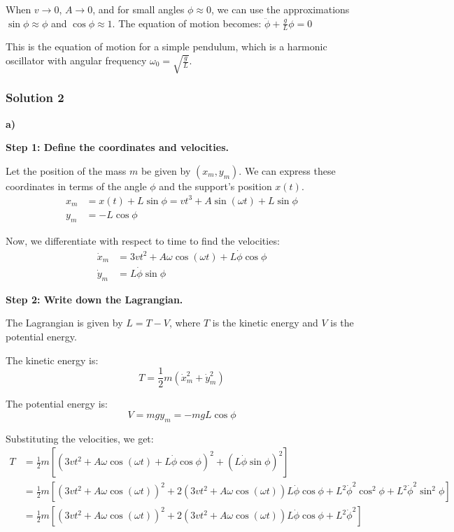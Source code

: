 \documentclass{article}
\begin{document}
When $v \to 0$, $A \to 0$, and for small angles $\phi \approx 0$, we can use the approximations $\sin\phi \approx \phi$ and $\cos\phi \approx 1$.
The equation of motion becomes:
$\ddot{\phi} + \frac{g}{L}\phi = 0$

This is the equation of motion for a simple pendulum, which is a harmonic oscillator with angular frequency $\omega_0 = \sqrt{\frac{g}{L}}$.


\subsubsection{Solution 2}
\textbf{a)}

\textbf{Step 1: Define the coordinates and velocities.}

Let the position of the mass $m$ be given by $(x_m, y_m)$.
We can express these coordinates in terms of the angle $\phi$ and the support's position $x(t)$.
\begin{align*}
x_m &= x(t) + L \sin \phi = vt^3 + A \sin(\omega t) + L \sin \phi \\
y_m &= -L \cos \phi
\end{align*}

Now, we differentiate with respect to time to find the velocities:
\begin{align*}
\dot{x}_m &= 3vt^2 + A\omega \cos(\omega t) + L \dot{\phi} \cos \phi \\
\dot{y}_m &= L \dot{\phi} \sin \phi
\end{align*}

\textbf{Step 2: Write down the Lagrangian.}

The Lagrangian is given by $L = T - V$, where $T$ is the kinetic energy and $V$ is the potential energy.

The kinetic energy is:
$$T = \frac{1}{2} m (\dot{x}_m^2 + \dot{y}_m^2)$$

The potential energy is:
$$V = mgy_m = -mgL \cos \phi$$

Substituting the velocities, we get:
\begin{align*}
T &= \frac{1}{2} m \left[ (3vt^2 + A\omega \cos(\omega t) + L \dot{\phi} \cos \phi)^2 + (L \dot{\phi} \sin \phi)^2 \right] \\
&= \frac{1}{2} m \left[ (3vt^2 + A\omega \cos(\omega t))^2 + 2(3vt^2 + A\omega \cos(\omega t))L \dot{\phi} \cos \phi + L^2 \dot{\phi}^2 \cos^2 \phi + L^2 \dot{\phi}^2 \sin^2 \phi \right] \\
&= \frac{1}{2} m \left[ (3vt^2 + A\omega \cos(\omega t))^2 + 2(3vt^2 + A\omega \cos(\omega t))L \dot{\phi} \cos \phi + L^2 \dot{\phi}^2 \right]
\end{align*}
\end{document}
